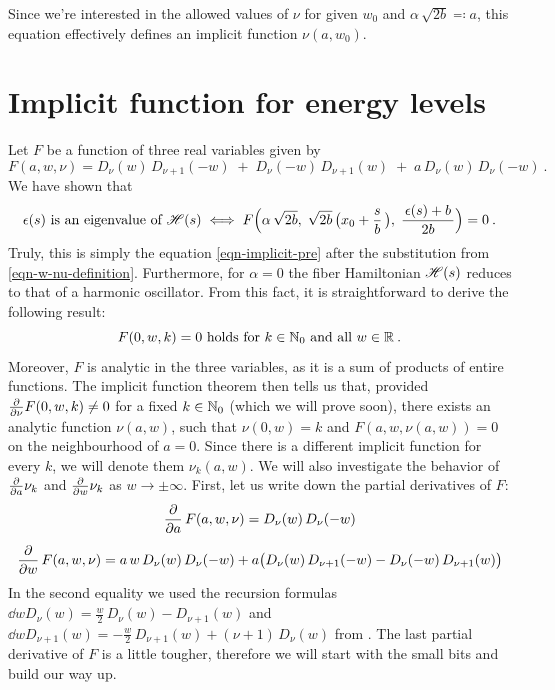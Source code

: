 Since we're interested in the allowed values of $\nu$ for given $w_0$ and $\alpha \, \sqrt{2b} \eqqcolon a$, this equation effectively defines an implicit function $\nu(a, w_0)$.

\section{Implicit function for energy levels}
Let $F$ be a function of three real variables given by
\begin{equation*}
    F(a, w, \nu) =
    D_\nu(w) \, D_{\nu+1}(-w)
    \;+\; D_\nu(-w) \, D_{\nu+1}(w)
    \;+\; a \, D_\nu(w) \, D_\nu(-w)
    \: .
\end{equation*}
We have shown that
\begin{align*}
    \epsilon(s) \text{ is an eigenvalue of } \mathscr{H}(s)
    \; \Longleftrightarrow \;
    F\Big(
        \alpha \, \sqrt{2b}, \;
        \sqrt{2b} \, \big( x_0 + \frac{s}{b} \, \big), \;
        \frac{\, \epsilon(s) + b \,}{2b}
    \Big) = 0 \: .
\end{align*}
Truly, this is simply the equation \eqref{eqn-implicit-pre} after the substitution from \eqref{eqn-w-nu-definition}. Furthermore, for $\alpha = 0$ the fiber Hamiltonian $\mathscr{H}(s)$ reduces to that of a harmonic oscillator. From this fact, it is straightforward to derive the following result:
\begin{equation*}
    F(0, w, k) = 0
    \text{ holds for }
    k \in \mathbb{N}_0
    \text{ and all }
    w \in \mathbb{R}
    \: .
\end{equation*}
Moreover, $F$ is analytic in the three variables, as it is a sum of products of entire functions. The implicit function theorem then tells us that, provided $\frac{\partial }{\partial \nu} F(0, w, k) \neq 0$ for a fixed $k \in \mathbb{N}_0$ (which we will prove soon), there exists an analytic function $\nu(a, w)$, such that $\nu(0,w) = k$ and $F(a, w, \nu(a,w)) = 0$ on the neighbourhood of $a=0$. Since there is a different implicit function for every $k$, we will denote them $\nu_k(a,w)$. We will also investigate the behavior of $\frac{\partial }{\partial a} \nu_k$ and $\frac{\partial }{\partial w} \nu_k$ as $w \to \pm\infty$. First, let us write down the partial derivatives of $F$:
\begin{gather*}
    \frac{\partial }{\partial a} \, F(a,w,\nu) = D_\nu(w) \, D_\nu(-w)
    \\[5pt]
    \frac{\partial }{\partial w} \, F(a,w,\nu)
    = a \, w \, D_\nu(w) \, D_\nu(-w)
    + a \big(
        D_\nu(w) \, D_{\nu + 1}(-w) - D_\nu(-w) \, D_{\nu+1}(w)
    \big)
\end{gather*}
In the second equality we used the recursion formulas $\dd{}{w} D_\nu(w) = \frac{w}{2} \, D_\nu(w) - D_{\nu+1}(w)$ and $\dd{}{w} D_{\nu+1}(w) = -\frac{w}{2} \, D_{\nu+1}(w) + (\nu+1) \, D_\nu(w)$ from \cite{GradshteynRyzhik}. The last partial derivative of $F$ is a little tougher, therefore we will start with the small bits and build our way up.
